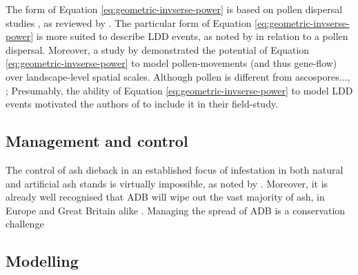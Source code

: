 The form of Equation \ref{eq:geometric-invserse-power} is based on pollen dispersal studies , as reviewed by \cite{nathan2012dispersal}. 
The particular form of Equation \ref{eq:geometric-invserse-power} is more suited to describe LDD events, as noted by \cite{https://doi.org/10.1111/j.1365-294X.2004.02100.x} in relation to a pollen dispersal. Moreover, a study by \cite{https://doi.org/10.1111/j.1365-294X.2006.03155.x} demonstrated the potential of Equation \ref{eq:geometric-invserse-power} to model pollen-movements (and thus gene-flow) over landscape-level spatial scales. Although pollen is different from ascospores..., ; Presumably, the ability of Equation \ref{eq:geometric-invserse-power} to model LDD events motivated the authors of \cite{grosdidier2018tracking} to include it in their field-study.


\subsection{Management and control}

The control of ash dieback in an established focus of infestation in both natural and artificial ash stands is virtually impossible, as noted by \cite{havrdova2017environmental}. Moreover, it is already well recognised that ADB will wipe out the vast majority of ash, in Europe and Great Britain alike \cite{ash-dieback-costs}. Managing the spread of ADB is a conservation challenge \cite{pautasso2013european} %





\blindtext

\subsection{Modelling}

\blindtext




